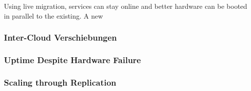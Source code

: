 \documentclass[journal]{IEEEtran}
\begin{document}
Using live migration, services can stay online and better hardware can
be booted in parallel to the existing. A new 

\subsubsection{Inter-Cloud Verschiebungen}
\label{sec:movclouds}

\blindtext

\subsubsection{Uptime Despite Hardware Failure}
\label{sec:hardfail}

\blindtext

\subsubsection{Scaling through Replication}

 

\end{document}
